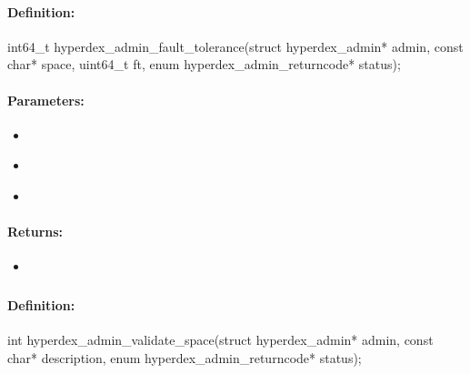 \paragraph{Definition:}
\begin{ccode}
int64_t hyperdex_admin_fault_tolerance(struct hyperdex_admin* admin,
        const char* space,
        uint64_t ft,
        enum hyperdex_admin_returncode* status);
\end{ccode}

\paragraph{Parameters:}
\begin{itemize}[noitemsep]
\item {}\\

\item {}\\

\item {}\\

\end{itemize}

\paragraph{Returns:}
\begin{itemize}[noitemsep]
\item {}\\

\end{itemize}

\pagebreak
\subsubsection{}
\label{api:c:validate_space}


\paragraph{Definition:}
\begin{ccode}
int hyperdex_admin_validate_space(struct hyperdex_admin* admin,
        const char* description,
        enum hyperdex_admin_returncode* status);
\end{ccode}

